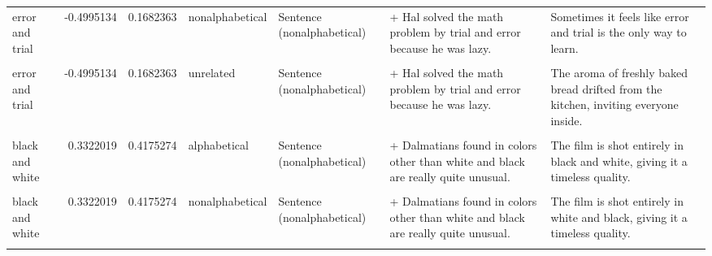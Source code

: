 \documentclass[
  12pt,
]{scrartcl}
\begin{document}
\begin{landscape}
\begin{longtable}{lrrllll}
error and trial & -0.4995134 & 0.1682363 & nonalphabetical & Sentence (nonalphabetical) & + Hal solved the math problem by trial and error because he was lazy. & Sometimes it feels like error and trial is the only way to learn.\\
\cellcolor{gray!6}{error and trial} & \cellcolor{gray!6}{-0.4995134} & \cellcolor{gray!6}{0.1682363} & \cellcolor{gray!6}{unrelated} & \cellcolor{gray!6}{Sentence (alphabetical)} & \cellcolor{gray!6}{+ Hal solved the math problem by error and trial because he was lazy.} & \cellcolor{gray!6}{The aroma of freshly baked bread drifted from the kitchen, inviting everyone inside.}\\
error and trial & -0.4995134 & 0.1682363 & unrelated & Sentence (nonalphabetical) & + Hal solved the math problem by trial and error because he was lazy. & The aroma of freshly baked bread drifted from the kitchen, inviting everyone inside.\\
\addlinespace
\cellcolor{gray!6}{black and white} & \cellcolor{gray!6}{0.3322019} & \cellcolor{gray!6}{0.4175274} & \cellcolor{gray!6}{alphabetical} & \cellcolor{gray!6}{Sentence (alphabetical)} & \cellcolor{gray!6}{+ Dalmatians found in colors other than black and white are really quite unusual.} & \cellcolor{gray!6}{The film is shot entirely in black and white, giving it a timeless quality.}\\
black and white & 0.3322019 & 0.4175274 & alphabetical & Sentence (nonalphabetical) & + Dalmatians found in colors other than white and black are really quite unusual. & The film is shot entirely in black and white, giving it a timeless quality.\\
\cellcolor{gray!6}{black and white} & \cellcolor{gray!6}{0.3322019} & \cellcolor{gray!6}{0.4175274} & \cellcolor{gray!6}{nonalphabetical} & \cellcolor{gray!6}{Sentence (alphabetical)} & \cellcolor{gray!6}{+ Dalmatians found in colors other than black and white are really quite unusual.} & \cellcolor{gray!6}{The film is shot entirely in white and black, giving it a timeless quality.}\\
black and white & 0.3322019 & 0.4175274 & nonalphabetical & Sentence (nonalphabetical) & + Dalmatians found in colors other than white and black are really quite unusual. & The film is shot entirely in white and black, giving it a timeless quality.\\
\cellcolor{gray!6}{black and white} & \cellcolor{gray!6}{0.3322019} & \cellcolor{gray!6}{0.4175274} & \cellcolor{gray!6}{unrelated} & \cellcolor{gray!6}{Sentence (alphabetical)} & \cellcolor{gray!6}{+ Dalmatians found in colors other than black and white are really quite unusual.} & \cellcolor{gray!6}{He watched the rain tap against the window, lost in thought.}\\

\end{longtable}
\end{landscape}
\end{document}
